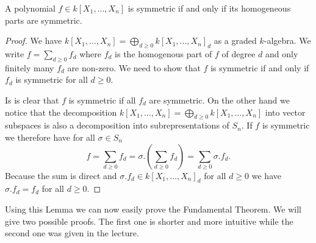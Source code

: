 \begin{lem}
 A polynomial $f \in k[X_1, \dotsc, X_n]$ is symmetric if and only if its homogeneous parts are symmetric.
\end{lem}
\begin{proof}
 We have $k[X_1, \dotsc, X_n] = \bigoplus_{d \geq 0} k[X_1, \dotsc, X_n]_d$ as a graded $k$-algebra. We write $f = \sum_{d \geq 0} f_d$ where $f_d$ is the homogenous part of $f$ of degree $d$ and only finitely many $f_d$ are non-zero. We need to show that $f$ is symmetric if and only if $f_d$ is symmetric for all $d \geq 0$.
 
 Is is clear that $f$ is symmetric if all $f_d$ are symmetric. On the other hand we notice that the decomposition $k[X_1, \dotsc, X_n] = \bigoplus_{d \geq 0} k[X_1, \dotsc, X_n]$ into vector subspaces is also a decomposition into subrepresentations of $S_n$. If $f$ is symmetric we therefore have for all $\sigma \in S_n$
 \[
  f = \sum_{d \geq 0} f_d = \sigma.\left( \sum_{d \geq 0} f_d \right) = \sum_{d \geq 0} \sigma.f_d.
 \]
 Because the sum is direct and $\sigma.f_d \in k[X_1, \dotsc, X_n]_d$ for all $d \geq 0$ we have $\sigma.f_d = f_d$ for all $d \geq 0$.
\end{proof}


Using this Lemma we can now easily prove the Fundamental Theorem. We will give two possible proofs. The first one is shorter and more intuitive while the second one was given in the lecture.


